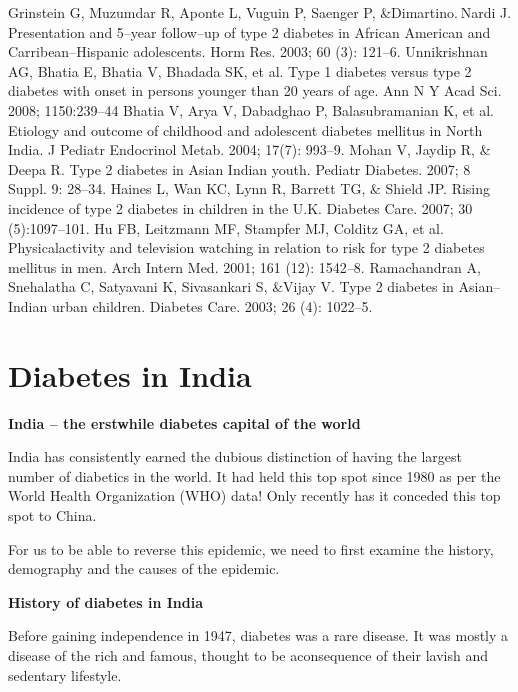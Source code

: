 \begin{thebibliography}{99}
 Grinstein G, Muzumdar R, Aponte L, Vuguin P, Saenger P, \&\break Dimartino. Nardi J. Presentation and 5–year follow–up of type 2 diabetes in African American and Carribean–Hispanic adole\-scents. Horm Res. 2003; 60 (3): 121–6.
  Unnikrishnan AG, Bhatia E, Bhatia V, Bhadada SK, et al. Type 1 dia\-betes versus type 2 diabetes with onset in persons younger than 20 years of age. Ann N Y Acad Sci. 2008; 1150:239–44
  Bhatia V, Arya V, Dabadghao P, Balasubramanian K, et al. Etio\-logy and outcome of childhood and adolescent diabetes mellitus in North India. J Pediatr Endocrinol Metab. 2004; 17(7): 993–9.
  Mohan V, Jaydip R, \& Deepa R. Type 2 diabetes in Asian Indian youth. Pediatr Diabetes. 2007; 8 Suppl. 9: 28–34.
  Haines L, Wan KC, Lynn R, Barrett TG, \& Shield JP. Rising incidence of type 2 diabetes in children in the U.K. Diabetes Care. 2007; 30 (5):1097–101.
  Hu FB, Leitzmann MF, Stampfer MJ, Colditz GA, et al. Physical\break activity and television watching in relation to risk for type 2 diabetes mellitus in men. Arch Intern Med. 2001; 161 (12): 1542–8.
  Ramachandran A, Snehalatha C, Satyavani K, Sivasankari S, \&\break Vijay V. Type 2 diabetes in Asian–Indian urban children. Diabetes Care. 2003; 26 (4): 1022–5.
 \end{thebibliography}


\chapter{Diabetes in India}\label{chap8}

\noindent\textbf{India – the erstwhile diabetes capital of the world}

India has consistently earned the dubious distinction of having the largest number of diabetics in the world. It had held this top spot since 1980 as per the World Health Organization (WHO) data! Only recently has it conceded this top spot to China.

For us to be able to reverse this epidemic, we need to first examine the history, demography and the causes of the epidemic.

\noindent\textbf{History of diabetes in India}

Before gaining independence in 1947, diabetes was a rare disease. It was mostly a disease of the rich and famous, thought to be a\break con\-sequence of their lavish and sedentary lifestyle.

